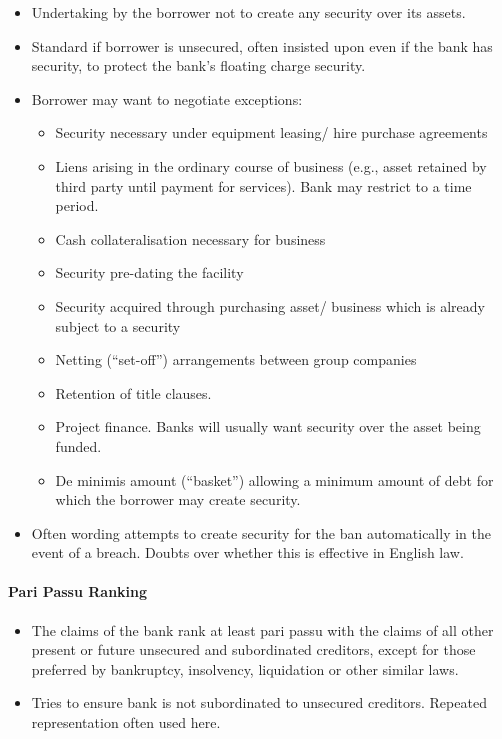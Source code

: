 \documentclass[
]{article}
\providecommand{\tightlist}{%
  \setlength{\itemsep}{0pt}\setlength{\parskip}{0pt}}
\begin{document}
\begin{itemize}
\tightlist
\item
  Undertaking by the borrower not to create any security over its
  assets.
\item
  Standard if borrower is unsecured, often insisted upon even if the
  bank has security, to protect the bank's floating charge security.
\item
  Borrower may want to negotiate exceptions:

  \begin{itemize}
  \tightlist
  \item
    Security necessary under equipment leasing/ hire purchase agreements
  \item
    Liens arising in the ordinary course of business (e.g., asset
    retained by third party until payment for services). Bank may
    restrict to a time period.
  \item
    Cash collateralisation necessary for business
  \item
    Security pre-dating the facility
  \item
    Security acquired through purchasing asset/ business which is
    already subject to a security
  \item
    Netting (``set-off'') arrangements between group companies
  \item
    Retention of title clauses.
  \item
    Project finance. Banks will usually want security over the asset
    being funded.
  \item
    De minimis amount (``basket'') allowing a minimum amount of debt for
    which the borrower may create security.
  \end{itemize}
\item
  Often wording attempts to create security for the ban automatically in
  the event of a breach. Doubts over whether this is effective in
  English law.
\end{itemize}

\hypertarget{pari-passu-ranking}{%
\paragraph{Pari Passu Ranking}\label{pari-passu-ranking}}

\begin{itemize}
\tightlist
\item
  The claims of the bank rank at least pari passu with the claims of all
  other present or future unsecured and subordinated creditors, except
  for those preferred by bankruptcy, insolvency, liquidation or other
  similar laws.
\item
  Tries to ensure bank is not subordinated to unsecured creditors.
  Repeated representation often used here.
\end{itemize}
\end{document}
